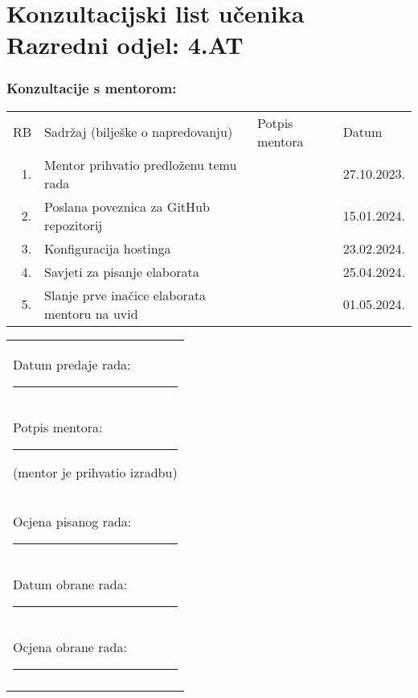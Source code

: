 \cleardoublepage
\section*{Konzultacijski list učenika \hfill Razredni odjel: 4.AT}

  \subsubsection*{Konzultacije s mentorom:}

    \begin{table}[h]
      \def\arraystretch{1.6}
      \footnotesize

      \centering
      \begin{tabularx}{\textwidth}{|r|X|l|l|}
      \cline{1-4}
      RB & Sadržaj (bilješke o napredovanju) & Potpis mentora & Datum \\ \cline{1-4}
      1. & Mentor prihvatio predloženu temu rada  &                & 27.10.2023. \\ \cline{1-4}
      2. & Poslana poveznica za GitHub repozitorij  &                & 15.01.2024. \\ \cline{1-4}
      3. & Konfiguracija hostinga &                & 23.02.2024. \\ \cline{1-4}
      4. & Savjeti za pisanje elaborata  &   &  25.04.2024. \\ \cline{1-4}
      5. & Slanje prve inačice elaborata mentoru na uvid  &                &   01.05.2024.    \\ \cline{1-4}
      \end{tabularx}
    \end{table}

    \begin{center}
      \vspace{-0.5cm}
      \begin{tabular}{@{}l@{}}
        Datum predaje rada: \rule{3cm}{0.5pt} \\
        Potpis mentora: \rule{4cm}{0.5pt} \scriptsize{(mentor je prihvatio izradbu)}\normalsize \\
        Ocjena pisanog rada: \rule{4cm}{0.5pt} \\
        Datum obrane rada: \rule{3cm}{0.5pt} \\
        Ocjena obrane rada: \rule{4cm}{0.5pt} \\
        \textbf{Konačna ocjena: \rule{4cm}{0.5pt}}
        \vspace{-0.5cm}
      \end{tabular}



    \end{center}

